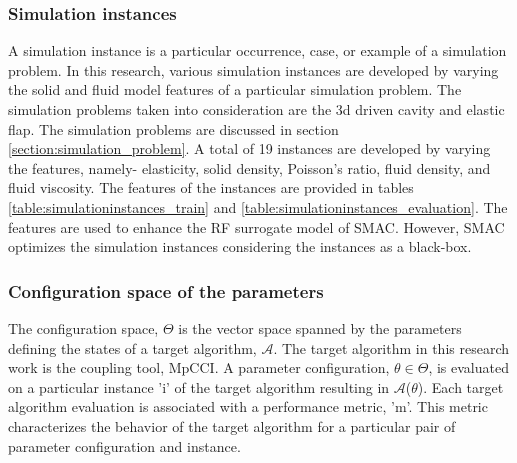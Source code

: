 \subsubsection{Simulation instances}
A simulation instance is a particular occurrence, case, or example of a simulation problem. In this research, various simulation instances are developed by varying the solid and fluid model features of a particular simulation problem. The simulation problems taken into consideration are the 3d driven cavity and elastic flap. The simulation problems are discussed in section \ref{section:simulation_problem}. A total of 19 instances are developed by varying the features, namely- elasticity, solid density, Poisson's ratio, fluid density, and fluid viscosity. The features of the instances are provided in tables \ref{table:simulationinstances_train} and \ref{table:simulationinstances_evaluation}. The features are used to enhance the RF surrogate model of SMAC. However, SMAC optimizes the simulation instances considering the instances as a black-box.

\subsubsection{Configuration space of the parameters}
\label{section:configurationspace}

The configuration space, $\Theta$ is the vector space spanned by the parameters defining the states of a target algorithm, $\mathcal{A}$. The target algorithm in this research work is the coupling tool, MpCCI. A parameter configuration, $\theta \in \Theta$, is evaluated on a particular instance 'i' of the target algorithm resulting in $\mathcal{A}$($\theta$). Each target algorithm evaluation is associated with a performance metric, 'm'. This metric characterizes the behavior of the target algorithm for a particular pair of parameter configuration and instance.


